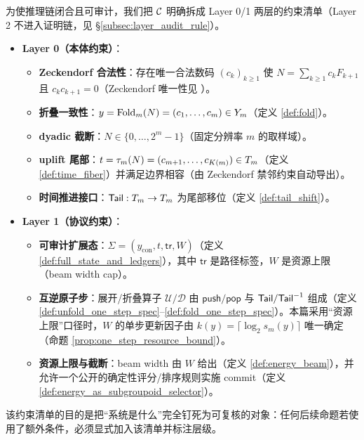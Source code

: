 \begin{definition}\label{def:C_minimal_constraints}
为使推理链闭合且可审计，我们把 \(\mathcal{C}\) 明确拆成 Layer 0/1 两层的约束清单（Layer 2 不进入证明链，见 \S\ref{subsec:layer_audit_rule}）。
\begin{itemize}
  \item \textbf{Layer 0（本体约束）}：
  \begin{itemize}
    \item \textbf{Zeckendorf 合法性}：存在唯一合法数码 \((c_k)_{k\ge 1}\) 使 \(N=\sum_{k\ge 1}c_kF_{k+1}\) 且 \(c_kc_{k+1}=0\)（Zeckendorf 唯一性见 \cite{Zeckendorf1972,AlloucheShallit2003,Lothaire2002}）。
    \item \textbf{折叠一致性}：\(y=\mathrm{Fold}_m(N)=(c_1,\dots,c_m)\in Y_m\)（定义 \ref{def:fold}）。
    \item \textbf{dyadic 截断}：\(N\in\{0,\dots,2^m-1\}\)（固定分辨率 \(m\) 的取样域）。
    \item \textbf{uplift 尾部}：\(t=\tau_m(N)=(c_{m+1},\dots,c_{K(m)})\in T_m\)（定义 \ref{def:time_fiber}）并满足边界相容（由 Zeckendorf 禁邻约束自动导出）。
    \item \textbf{时间推进接口}：\(\mathsf{Tail}:T_m\to T_m\) 为尾部移位（定义 \ref{def:tail_shift}）。
  \end{itemize}
  \item \textbf{Layer 1（协议约束）}：
  \begin{itemize}
    \item \textbf{可审计扩展态}：\(\Sigma=(y_{\mathrm{con}},t,\mathsf{tr},W)\)（定义 \ref{def:full_state_and_ledgers}），其中 \(\mathsf{tr}\) 是路径标签，\(W\) 是资源上限（beam width cap）。
    \item \textbf{互逆原子步}：展开/折叠算子 \(\mathcal U/\mathcal D\) 由 \(\mathsf{push}/\mathsf{pop}\) 与 \(\mathsf{Tail}/\mathsf{Tail}^{-1}\) 组成（定义 \ref{def:unfold_one_step_spec}--\ref{def:fold_one_step_spec}）。本篇采用“资源上限”口径时，\(W\) 的单步更新因子由 \(k(y)=\lceil\log_2 s_m(y)\rceil\) 唯一确定（命题 \ref{prop:one_step_resource_bound}）。
    \item \textbf{资源上限与截断}：beam width 由 \(W\) 给出（定义 \ref{def:energy_beam}），并允许一个公开的确定性评分/排序规则实施 commit（定义 \ref{def:energy_as_subgroupoid_selector}）。
  \end{itemize}
\end{itemize}
该约束清单的目的是把“系统是什么”完全钉死为可复核的对象：任何后续命题若使用了额外条件，必须显式加入该清单并标注层级。
\end{definition}

